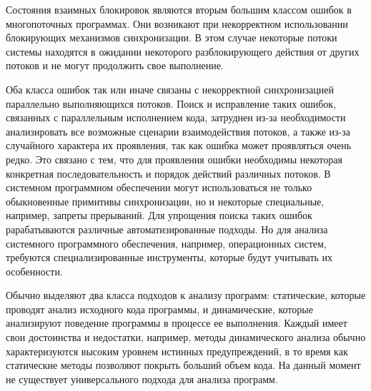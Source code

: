  
Состояния взаимных блокировок являются вторым большим классом ошибок в многопоточных программах.
Они возникают при некорректном использовании блокирующих механизмов синхронизации.
В этом случае некоторые потоки системы находятся в ожидании некоторого разблокирующего действия от других потоков и не могут продолжить свое выполнение. 

Оба класса ошибок так или иначе связаны с некорректной синхронизацией параллельно выполняющихся потоков.
Поиск и исправление таких ошибок, связанных с параллельным исполнением кода, затруднен из-за необходимости анализировать все возможные сценарии взаимодействия потоков, а также из-за случайного характера их проявления, так как ошибка может проявляться очень редко.
Это связано с тем, что для проявления ошибки необходимы некоторая конкретная последовательность и порядок действий различных потоков. 
В системном программном обеспечении могут использоваться не только обыкновенные примитивы синхронизации, но и некоторые специальные, например, запреты прерываний. 
Для упрощения поиска таких ошибок рарабатываются различные автоматизированные подходы.
Но для анализа системного программного обеспечения, например, операционных систем, требуются специализированные инструменты, которые будут учитывать их особенности.

Обычно выделяют два класса подходов к анализу программ: статические, которые проводят анализ исходного кода программы, и динамические, которые анализируют поведение программы в процессе ее выполнения.
Каждый имеет свои достоинства и недостатки, например, методы динамического анализа обычно характеризуются высоким уровнем истинных предупреждений, в то время как статические методы позволяют покрыть больший объем кода.
На данный момент не существует универсального подхода для анализа программ.

